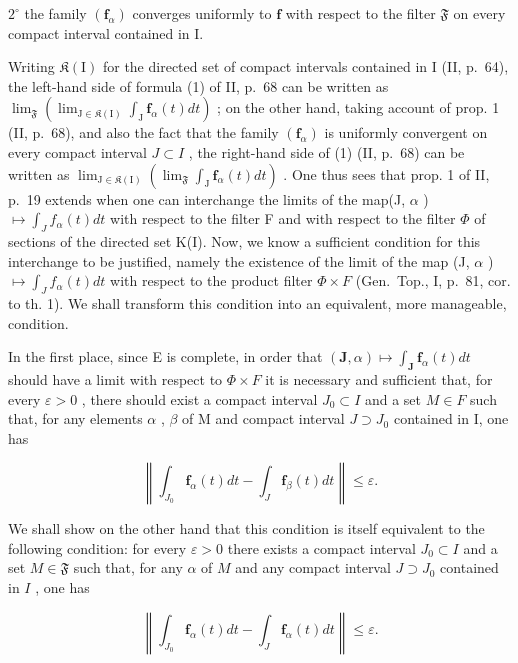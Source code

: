 \(2^{\circ}\) the family \((\mathbf{f}_{\alpha})\) converges uniformly to \(\mathbf{f}\) with respect to the filter \(\mathfrak{F}\) on every compact interval contained in I.

Writing \(\mathfrak{K}(\mathrm{I})\) for the directed set of compact intervals contained in I (II, p.~64), the left-hand side of formula (1) of II, p.~68 can be written as \(\lim_{\mathfrak{F}}\left(\lim_{\mathrm{J}\in \mathfrak{K}(\mathrm{I})}\int_{\mathrm{J}}\mathbf{f}_{\alpha}(t)dt\right)\) ; on
the other hand, taking account of prop. 1 (II, p.~68), and also the fact that the family \((\mathbf{f}_{\alpha})\) is uniformly convergent on every compact interval \(J \subset I\) , the right-hand side of (1) (II, p.~68) can be written as \(\lim_{\mathrm{J} \in \mathfrak{K}(\mathrm{I})} \left( \lim_{\mathfrak{F}} \int_{\mathrm{J}} \mathbf{f}_{\alpha}(t) dt \right)\) . One thus sees that prop. 1 of
II, p.~19 extends when one can interchange the limits of the map(J, \(\alpha\) ) \(\mapsto \int_{J} f_{\alpha}(t) dt\) with respect to the filter F and with respect to the filter \(\Phi\) of sections of the directed set K(I). Now, we know a sufficient condition for this interchange to be justified, namely the existence of the limit of the map (J, \(\alpha\) ) \(\mapsto \int_{J} f_{\alpha}(t) dt\) with respect to the product filter \(\Phi \times F\) (Gen.~Top., I, p.~81, cor. to th. 1). We shall transform this condition into an equivalent, more manageable, condition.

In the first place, since E is complete, in order that \((\mathbf{J}, \alpha) \mapsto \int_{\mathbf{J}} \mathbf{f}_{\alpha}(t) dt\) should have a limit with respect to \(\Phi \times F\) it is necessary and sufficient that, for every \(\varepsilon > 0\) , there should exist a compact interval \(J_{0} \subset I\) and a set \(M \in F\) such that, for any elements \(\alpha\) , \(\beta\) of M and compact interval \(J \supset J_{0}\) contained in I, one has

\[
\left\| \int_ {J _ {0}} \mathbf {f} _ {\alpha} (t) d t - \int_ {J} \mathbf {f} _ {\beta} (t) d t \right\| \leqslant \varepsilon .\tag{4}
\]

We shall show on the other hand that this condition is itself equivalent to the following condition: for every \(\varepsilon > 0\) there exists a compact interval \(J_0 \subset I\) and a set \(M \in \mathfrak{F}\) such that, for any \(\alpha\) of \(M\) and any compact interval \(J \supset J_0\) contained in \(I\) , one has

\[
\left\| \int_ {J _ {0}} \mathbf {f} _ {\alpha} (t) d t - \int_ {J} \mathbf {f} _ {\alpha} (t) d t \right\| \leqslant \varepsilon .\tag{5}
\]

